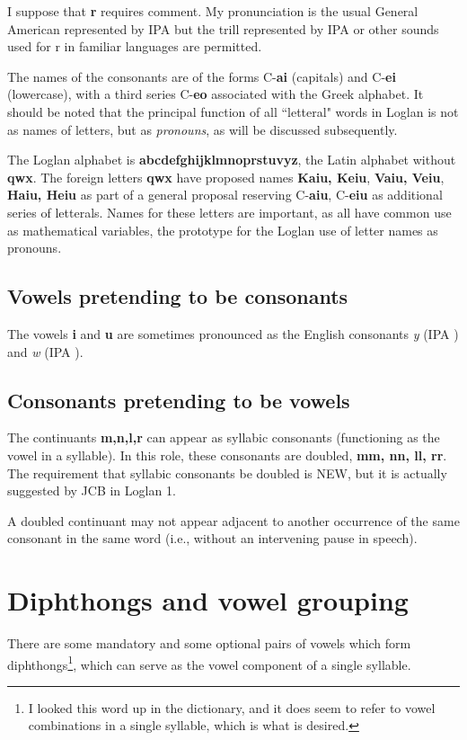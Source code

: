 \documentclass[12pt]{book}
\begin{document}
I suppose that {\bf r} requires comment.  My pronunciation is the usual General American represented by IPA  but the trill represented by IPA  or other sounds used for r in familiar languages are permitted.

The names of the consonants are of the forms C-{\bf ai} (capitals) and C-{\bf ei} (lowercase), with a third series C-{\bf eo} associated with the Greek alphabet.   It should be noted that the principal function of all ``letteral" words in Loglan is not as names of letters, but as {\em pronouns\/}, as will be discussed subsequently.  

The Loglan alphabet is {\bf abcdefghijklmnoprstuvyz}, the Latin alphabet without {\bf qwx}.  The foreign letters {\bf qwx}
have proposed names {\bf Kaiu, Keiu}, {\bf Vaiu, Veiu}, {\bf Haiu, Heiu} as part of a general proposal reserving C-{\bf aiu}, C-{\bf eiu} as additional series of letterals.    Names for these letters are important, as all have common use as mathematical variables, the prototype for the Loglan use of letter names as pronouns.


\subsection{Vowels pretending to be consonants}

The vowels {\bf i} and {\bf u} are sometimes pronounced as the English consonants {\em y} (IPA ) and {\em w} (IPA ).

\subsection{Consonants pretending to be vowels}

The continuants {\bf m,n,l,r} can appear as syllabic consonants (functioning as the vowel in a syllable).  In this role, these consonants are doubled,
{\bf mm, nn, ll, rr}.  The requirement that syllabic consonants be doubled is NEW, but it is actually suggested by JCB in Loglan 1.

A doubled continuant may not appear adjacent to another occurrence of the same consonant in the same word (i.e., without an intervening pause in speech).

\section{Diphthongs and vowel grouping}

There are some mandatory and some optional pairs of vowels which form diphthongs\footnote{I looked this word up in the dictionary, and it does seem to refer to vowel combinations in a single syllable, which is what is desired.}, which can serve as the vowel component of a single syllable.
\end{document}
